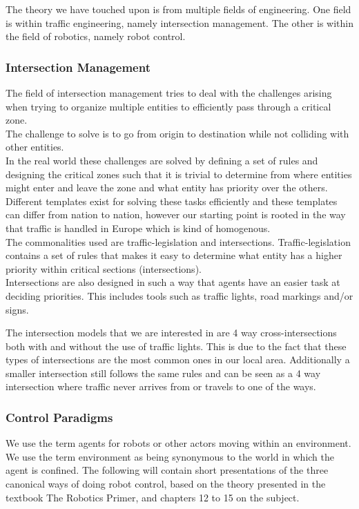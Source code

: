 The theory we have touched upon is from multiple fields of engineering. One field is within traffic engineering, namely intersection management. The other is within the field of robotics, namely robot control.

\subsubsection{Intersection Management}
The field of intersection management tries to deal with the challenges arising when trying to organize multiple entities to efficiently pass through a critical zone.\\
The challenge to solve is to go from origin to destination while not colliding with other entities.\\

In the real world these challenges are solved by defining a set of rules and designing the critical zones such that it is trivial to determine from where entities might enter and leave the zone and what entity has priority over the others.\\

Different templates exist for solving these tasks efficiently and these templates can differ from nation to nation, however our starting point is rooted in the way that traffic is handled in Europe which is kind of homogenous.\\

The commonalities used are traffic-legislation and intersections.
Traffic-legislation contains a set of rules that makes it easy to determine what entity has a higher priority within critical sections (intersections).\\
Intersections are also designed in such a way that agents have an easier task at deciding priorities. 
This includes tools such as traffic lights, road markings and/or signs.

The intersection models that we are interested in are 4 way cross-intersections both with and without the use of traffic lights.
This is due to the fact that these types of intersections are the most common ones in our local area. Additionally a smaller intersection still follows the same rules and can be seen as a 4 way intersection where traffic never arrives from or travels to one of the ways.

\subsubsection{Control Paradigms}
We use the term agents for robots or other actors moving within an environment.\\
We use the term environment as being synonymous to the world in which the agent is confined.
The following will contain short presentations of the three canonical ways of doing robot control, based on the theory presented in the textbook The Robotics Primer\citep{book:mataric}, and chapters 12 to 15 on the subject.\\

